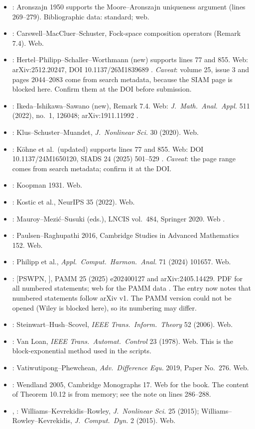 \documentclass[11pt]{amsart}
\newcommand{\PS}[1][]{[PSWPN\ifx\relax#1\relax\else, #1\fi]}
\begin{document}
\begin{itemize}
\item \cite{Aronszajn}: Aronszajn 1950 supports the Moore--Aronszajn uniqueness argument (lines 269--279).
Bibliographic data: standard; web.
\item \cite{CarswellMacCluerSchuster}: Carswell--MacCluer--Schuster, Fock-space composition operators (Remark 7.4).
Web.
\item \cite{Hertel}: Hertel--Philipp--Schaller--Worthmann (new) supports lines 77 and 855. Web: arXiv:2512.20247,
DOI 10.1137/26M1839689 \cite{src-hertel}. \emph{Caveat}: volume 25, issue 3 and pages 2044--2083 come from search
metadata, because the SIAM page is blocked here. Confirm them at the DOI before submission.
\item \cite{IIS}: Ikeda--Ishikawa--Sawano (new), Remark 7.4. Web: \emph{J.\ Math.\ Anal.\ Appl.} 511 (2022), no.~1,
126048; arXiv:1911.11992 \cite{src-iis}.
\item \cite{Klus}: Klus--Schuster--Muandet, \emph{J.\ Nonlinear Sci.} 30 (2020). Web.
\item \cite{Koehne}: Köhne et al.\ (updated) supports lines 77 and 855. Web: DOI 10.1137/24M1650120, SIADS 24 (2025)
501--529 \cite{src-koehne}. \emph{Caveat}: the page range comes from search metadata; confirm it at the DOI.
\item \cite{Koopman}: Koopman 1931. Web.
\item \cite{Kostic}: Kostic et al., NeurIPS 35 (2022). Web.
\item \cite{Mauroy}: Mauroy--Mezi\'c--Susuki (eds.), LNCIS vol.\ 484, Springer 2020. Web \cite{src-mauroy}.
\item \cite{PaulsenRaghupathi}: Paulsen--Raghupathi 2016, Cambridge Studies in Advanced Mathematics 152. Web.
\item \cite{PhilippACHA}: Philipp et al., \emph{Appl.\ Comput.\ Harmon.\ Anal.} 71 (2024) 101657. Web.
\item \cite{PSWPN}: \PS, PAMM 25 (2025) e202400127 and arXiv:2405.14429. PDF for all numbered statements; web for the
PAMM data \cite{src-pswpn}. The entry now notes that numbered statements follow arXiv v1. The PAMM version could not be
opened (Wiley is blocked here), so its numbering may differ.
\item \cite{SHS}: Steinwart--Hush--Scovel, \emph{IEEE Trans.\ Inform.\ Theory} 52 (2006). Web.
\item \cite{VanLoan}: Van Loan, \emph{IEEE Trans.\ Automat.\ Control} 23 (1978). Web. This is the block-exponential
method used in the scripts.
\item \cite{Vatiwutipong}: Vatiwutipong--Phewchean, \emph{Adv.\ Difference Equ.} 2019, Paper No.\ 276. Web.
\item \cite{Wendland}: Wendland 2005, Cambridge Monographs 17. Web for the book. The content of Theorem 10.12 is from
memory; see the note on lines 286--288.
\item \cite{WilliamsEDMD}, \cite{WilliamsKernel}: Williams--Kevrekidis--Rowley, \emph{J.\ Nonlinear Sci.} 25 (2015);
Williams--Rowley--Kevrekidis, \emph{J.\ Comput.\ Dyn.} 2 (2015). Web.
\end{itemize}
\end{document}
